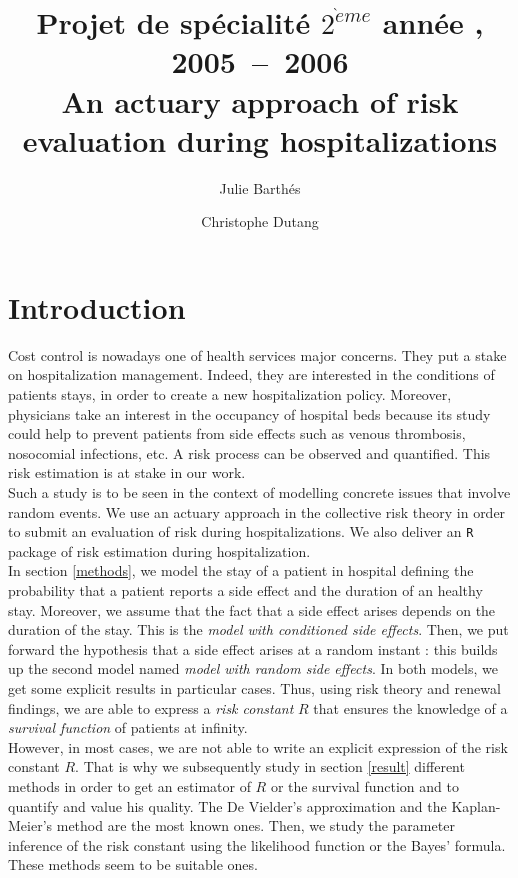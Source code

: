 \documentclass[12pt,twoside]{article}
\title{\vspace{-1.5cm}
{\normalsize Projet de sp\'ecialit\'e \hfill
       $2^{\grave{e}me}$ ann\'ee \sigle{ensimag}, 2005~--~2006}
       \\[5cm]
	\textsf{An actuary approach of risk evaluation during hospitalizations}}
\author{Julie Barthés \and Christophe Dutang}
\begin{document}


\addtolength{\parskip}{2mm}
\maketitle
\date
\newpage
\tableofcontents 
\newpage

\section{Introduction}
\label{introduction}

Cost control is nowadays one of health services major concerns. They put a stake on hospitalization management. 
Indeed, they are interested in the conditions of patients stays, in order to create a new hospitalization policy. Moreover, physicians take an interest in the occupancy of hospital beds because its study could help to prevent patients from side effects such as venous thrombosis, nosocomial infections, etc. A risk process can be observed and quantified. This risk estimation is at stake in our work.\\

Such a study is to be seen in the context of modelling concrete issues that involve random events. 
We use an actuary approach in the collective risk theory in order to submit an evaluation of risk during hospitalizations. We also deliver an \texttt{R} package of risk estimation during hospitalization.\\

In section \ref{methods}, we model the stay of a patient in hospital defining the probability that a patient reports a side effect and the duration of an healthy stay. Moreover, we assume that the fact that a side effect arises depends on the duration of the stay. This is the \textsl{model with conditioned side effects}. Then, we put forward the hypothesis that a side effect arises at a random instant : this builds up the second model named \textsl{model with random side effects}. In both models, we get some explicit results in particular cases. Thus, using risk theory and renewal findings, we are able to express a \textsl{risk constant} $R$ that ensures the knowledge of a \textsl{survival function} of patients at infinity.\\

However, in most cases, we are not able to write an explicit expression of the risk constant $R$. That is why we subsequently study in section \ref{result} different methods in order to get an estimator of $R$ or the survival function and to quantify and value his quality. The De Vielder's approximation and the Kaplan-Meier's method are the most known ones. Then, we study the parameter inference of the risk constant using the likelihood function or the Bayes' formula. These methods seem to be suitable ones. \\
\end{document}
